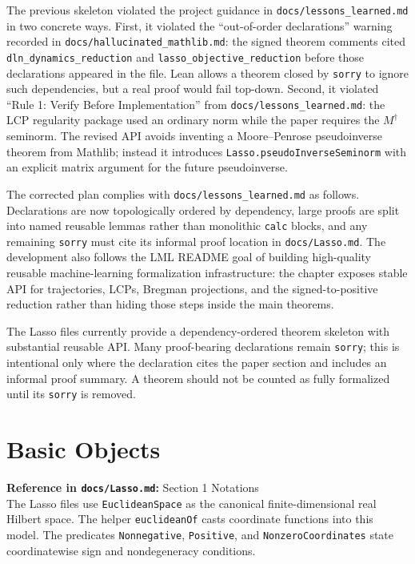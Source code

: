 \begin{remark}
The previous skeleton violated the project guidance in
\texttt{docs/lessons\_learned.md} in two concrete ways.
First, it violated the ``out-of-order declarations'' warning recorded in
\texttt{docs/hallucinated\_mathlib.md}: the signed theorem comments cited
\texttt{dln\_dynamics\_reduction} and
\texttt{lasso\_objective\_reduction} before those declarations appeared in the
file.  Lean allows a theorem closed by \texttt{sorry} to ignore such dependencies,
but a real proof would fail top-down.
Second, it violated ``Rule 1: Verify Before Implementation'' from
\texttt{docs/lessons\_learned.md}: the LCP regularity package used an ordinary
norm while the paper requires the $M^\dagger$ seminorm.  The revised API avoids
inventing a Moore--Penrose pseudoinverse theorem from Mathlib; instead it
introduces \texttt{Lasso.pseudoInverseSeminorm} with an explicit matrix argument
for the future pseudoinverse.

The corrected plan complies with \texttt{docs/lessons\_learned.md} as follows.
Declarations are now topologically ordered by dependency, large proofs are split
into named reusable lemmas rather than monolithic \texttt{calc} blocks, and any
remaining \texttt{sorry} must cite its informal proof location in
\texttt{docs/Lasso.md}.  The development also follows the LML README goal of
building high-quality reusable machine-learning formalization infrastructure:
the chapter exposes stable API for trajectories, LCPs, Bregman projections, and
the signed-to-positive reduction rather than hiding those steps inside the main
theorems.
\end{remark}

\begin{remark}
The Lasso files currently provide a dependency-ordered theorem skeleton with
substantial reusable API.  Many proof-bearing declarations remain
\texttt{sorry}; this is intentional only where the declaration cites the paper
section and includes an informal proof summary.  A theorem should not be counted
as fully formalized until its \texttt{sorry} is removed.
\end{remark}

\section{Basic Objects}

\begin{definition}\label{def:lassoEuclideanAPI}
  \textbf{Reference in \texttt{docs/Lasso.md}:} Section 1 Notations\\
The Lasso files use \texttt{EuclideanSpace} as the canonical finite-dimensional
real Hilbert space.
The helper \texttt{euclideanOf} casts coordinate functions into this model.
The predicates \texttt{Nonnegative}, \texttt{Positive}, and
\texttt{NonzeroCoordinates} state coordinatewise sign and nondegeneracy
conditions.
\end{definition}

